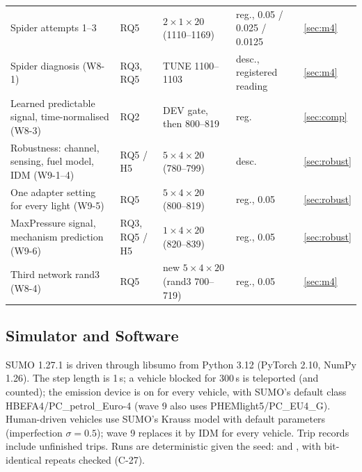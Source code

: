 \begin{table}[t]
\begin{tabular}{@{}p{5.3cm}p{1.5cm}p{6.0cm}p{2.5cm}l@{}}
Spider attempts 1--3 & RQ5 & $2\times1\times20$ (1110--1169) & reg., 0.05 / 0.025 / 0.0125 & \ref{sec:m4}\\
Spider diagnosis (W8-1) & RQ3, RQ5 & TUNE 1100--1103 & desc., registered reading & \ref{sec:m4}\\
Learned predictable signal, time-normalised (W8-3) & RQ2 & DEV gate, then 800--819 & reg. & \ref{sec:comp}\\
Robustness: channel, sensing, fuel model, IDM (W9-1--4) & RQ5 / H5 & $5\times4\times20$ (780--799) & desc. & \ref{sec:robust}\\
One adapter setting for every light (W9-5) & RQ5 & $5\times4\times20$ (800--819) & reg., 0.05 & \ref{sec:robust}\\
MaxPressure signal, mechanism prediction (W9-6) & RQ3, RQ5 / H5 & $1\times4\times20$ (820--839) & reg., 0.05 & \ref{sec:robust}\\
Third network rand3 (W8-4) & RQ5 & new $5\times4\times20$ (rand3 700--719) & reg., 0.05 & \ref{sec:m4}\\\bottomrule
\end{tabular}\end{table}

\subsection{Simulator and Software}
SUMO 1.27.1 \cite{lopez2018} is driven through libsumo from Python 3.12 (PyTorch 2.10, NumPy 1.26). The step length is 1\,s; a vehicle
blocked for 300\,s is teleported (and counted); the emission device is on for every vehicle, with SUMO's default class
HBEFA4/PC\_petrol\_Euro-4 \cite{krajzewicz2015} (wave 9 also uses PHEMlight5/PC\_EU4\_G). Human-driven vehicles use SUMO's Krauss model
\cite{krauss1998} with default parameters (imperfection $\sigma=0.5$); wave 9 replaces it by IDM \cite{treiber2000} for every vehicle.
Trip records include unfinished trips. Runs are deterministic given the seed:  and , with
bit-identical repeats checked (C-27).

